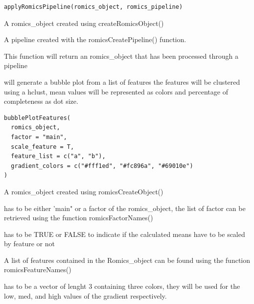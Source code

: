 \documentclass[a4paper]{book}
\begin{document}
%
\begin{Usage}
\begin{verbatim}
applyRomicsPipeline(romics_object, romics_pipeline)
\end{verbatim}
\end{Usage}
%
\begin{Arguments}
\begin{ldescription}
\item[\code{romics\_object}] A romics\_object created using createRomicsObject()

\item[\code{romics\_pipeline}] A pipeline created with the romicsCreatePipeline() function.
\end{ldescription}
\end{Arguments}
%
\begin{Value}
This function will return an romics\_object that has been processed through a pipeline
\end{Value}
%
\begin{Description}
will generate a bubble plot from a list of features the features will be clustered using a hclust, mean values will be represented as colors and percentage of completeness as dot size.
\end{Description}
%
\begin{Usage}
\begin{verbatim}
bubblePlotFeatures(
  romics_object,
  factor = "main",
  scale_feature = T,
  feature_list = c("a", "b"),
  gradient_colors = c("#fff1ed", "#fc896a", "#69010e")
)
\end{verbatim}
\end{Usage}
%
\begin{Arguments}
\begin{ldescription}
\item[\code{romics\_object}] A romics\_object created using romicsCreateObject()

\item[\code{factor}] has to be either 'main" or a factor of the romics\_object, the list of factor can be retrieved using the function romicsFactorNames()

\item[\code{scale\_feature}] has to be TRUE or FALSE to indicate if the calculated means have to be scaled by feature or not

\item[\code{feature\_list}] A list of features contained in the Romics\_object can be found using the function romicsFeatureNames()

\item[\code{gradient\_colors}] has to be a vector of lenght 3 containing three colors, they will be used for the low, med, and high values of the gradient respectively.
\end{ldescription}
\end{Arguments}
\end{document}
